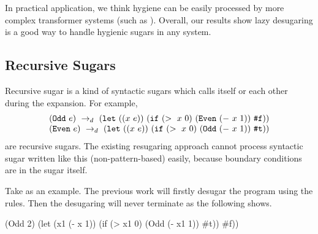 
In practical application, we think hygiene can be easily processed by more complex transformer systems (such as \cite{10.5555/1792878.1792884}). Overall, our results show lazy desugaring is a good way to handle hygienic sugars in any system.

\subsection{Recursive Sugars}
\label{sec:recursiveSugar}

Recursive sugar is a kind of syntactic sugars which calls itself or each other during the expansion. For example,
\[
\begin{array}{l}
(\mbox{\tt Odd}~e) ~\rightarrow_d~ (\mbox{\tt let}~((x~e))~(\mbox{\tt if}~(>~x~0)~(\mbox{\tt Even}~(-~x~1))~\mbox{\tt \#f}))\\
(\mbox{\tt Even}~e) ~\rightarrow_d~ (\mbox{\tt let}~((x~e))~(\mbox{\tt if}~(>~x~0)~(\mbox{\tt Odd}~(-~x~1))~\mbox{\tt \#t}))
\end{array}
\]
are recursive sugars. The existing resugaring approach cannot process syntactic sugar written like this (non-pattern-based) easily, because boundary conditions are in the sugar itself.

Take  as an example. The previous work will firstly desugar the program using the rules. Then the desugaring will never terminate as the following shows.
\begin{footnotesize}
\begin{Codes}
   (Odd 2)
\qquad\quad(let (x1 (- x 1)) (if (> x1 0) (Odd (- x1 1)) \#t))
\qquad\quad\#f))
\end{Codes}
\end{footnotesize}



